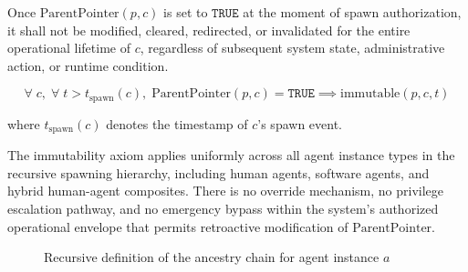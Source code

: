\begin{axiom}
\label{ax:parent-pointer-immutability}
Once $\text{ParentPointer}(p, c)$ is set to $\texttt{TRUE}$ at the moment of spawn authorization, it shall not be modified, cleared, redirected, or invalidated for the entire operational lifetime of $c$, regardless of subsequent system state, administrative action, or runtime condition.

\[
\forall\; c,\; \forall\; t > t_{\text{spawn}}(c),\; \text{ParentPointer}(p, c) = \texttt{TRUE} \implies \text{immutable}(p, c, t)
\]

where $t_{\text{spawn}}(c)$ denotes the timestamp of $c$'s spawn event.
\end{axiom}

The immutability axiom applies uniformly across all agent instance types in the recursive spawning hierarchy, including human agents, software agents, and hybrid human-agent composites. There is no override mechanism, no privilege escalation pathway, and no emergency bypass within the system's authorized operational envelope that permits retroactive modification of $\text{ParentPointer}$.

\begin{figure}[tb]
\centering
{}
\caption{Recursive definition of the ancestry chain for agent instance $a$}
\label{fig:chain-definition}
\end{figure}

